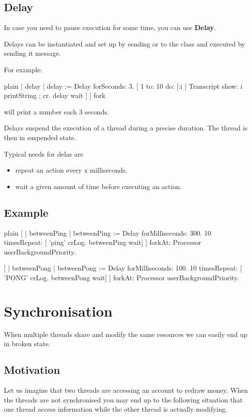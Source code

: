\documentclass[10pt,twoside,english]{_support/latex/sbabook/sbabook}
\begin{document}
\section{Delay}
In case you need to pause execution for some time, you can use \textbf{Delay}.

Delays can be instantiated and set up by sending  or  to the class  and executed by sending it  message.

For example:

\begin{displaycode}{plain}
| delay |
delay := Delay forSeconds: 3.
[ 1 to: 10 do: [:i |
  Transcript show: i printString ; cr.
  delay wait ] ] fork
\end{displaycode}

will print a number each 3 seconds.

Delays suspend the execution of a thread during a precise duration. The thread is then in suspended state.

Typical needs for delas are 

\begin{itemize}
\item repeat an action every x milliseconds.
\item wait a given amount of time before executing an action. 
\end{itemize}
\section{Example}
\begin{displaycode}{plain}
[
| betweenPing |  
betweenPing := Delay forMilliseconds: 300.
10 timesRepeat: [ 
   'ping' crLog. 
   betweenPing wait] 
   ] forkAt: Processor userBackgroundPriority.
	  
[
| betweenPong |  
betweenPong := Delay forMilliseconds: 100.
10 timesRepeat: [ 
   'PONG' crLog. 
   betweenPong wait]
   ] forkAt: Processor userBackgroundPriority.
\end{displaycode}
\chapter{Synchronisation}
When multiple threads share and modify the same resources we can easily end up in 
broken state. 
\section{Motivation}
Let us imagine that two threads are accessing an account to redraw money.
When the threads are not synchronised you may end up to the following situation
that one thread access information while the other thread is actually modifying. 
\end{document}
